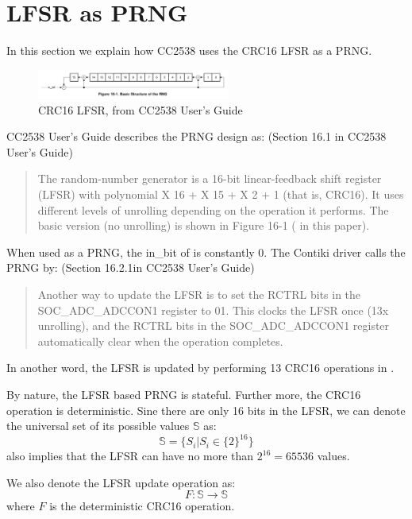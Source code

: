 \section{LFSR as PRNG} \label{LFSR}
In this section we explain how CC2538 uses the CRC16 LFSR as a PRNG. 

\begin{figure}[!t]
\centering
\includegraphics[width=2.5in]{fig/crc16.png}
\caption{CRC16 LFSR, from CC2538 User's Guide}
\label{CRC16}
\end{figure}

CC2538 User's Guide describes the PRNG design as: (Section 16.1 in CC2538 User's Guide)
\begin{quote}
The random-number generator is a 16-bit linear-feedback shift register (LFSR) with polynomial X 16 + X 15 +
X 2 + 1 (that is, CRC16). It uses different levels of unrolling depending on the operation it performs. The basic version (no unrolling) is shown in Figure 16-1 ( in this paper).
\end{quote}

When used as a PRNG, the in\_bit of  is constantly $0$. The Contiki driver calls the PRNG by: (Section 16.2.1in CC2538 User's Guide)
\begin{quote}
Another way to update the LFSR is to set the RCTRL bits in the SOC\_ADC\_ADCCON1 register to 01. This clocks the LFSR once (13x unrolling), and the RCTRL bits in the SOC\_ADC\_ADCCON1 register automatically clear when the operation completes.
\end{quote}

In another word, the LFSR is updated by performing 13 CRC16 operations in .

By nature, the LFSR based PRNG is stateful. Further more, the CRC16 operation is deterministic. Sine there are only 16 bits in the LFSR, we can denote the universal set of its  possible values $\mathbb{S}$ as:
\begin{equation} \label{PRNGState}
\mathbb{S} = \{ S_{i} | S_{i} \in \{2\}^{16}\}
\end{equation}
 also implies that the LFSR can have no more than $2^{16} = 65536$ values.

We also denote the LFSR update operation as:
\begin{equation}
F:\mathbb{S} \rightarrow \mathbb{S}
\end{equation}
where $F$ is the deterministic CRC16 operation.

